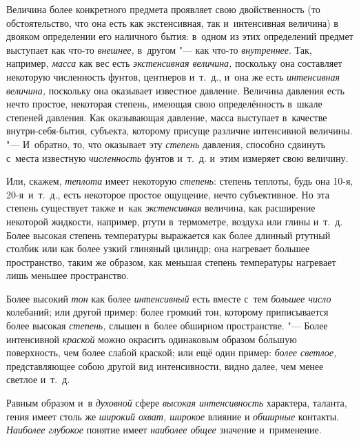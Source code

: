 Величина более конкретного предмета проявляет свою двойственность (то
обстоятельство, что она есть как экстенсивная, так и~интенсивная величина)
в двояком определении его наличного бытия: в~одном из этих определений
предмет выступает как что-то {\em внешнее,} в~другом "--- как что-то
{\em внутреннее}. Так, например, {\em масса} как вес есть {\em экстенсивная
величина,} поскольку она составляет некоторую численность фунтов, центнеров
и~т.~д., и~она же есть {\em интенсивная величина,} поскольку она оказывает
известное давление. Величина давления есть нечто простое, некоторая степень,
имеющая свою определённость в~шкале степеней давления. Как оказывающая
давление, масса выступает в~качестве внутри-себя-бытия, субъекта, которому
присуще различие интенсивной величины. "--- И~обратно, то, что оказывает эту
{\em степень} давления, способно сдвинуть с~места известную {\em численность}
фунтов и~т.~д. и~этим измеряет свою величину.

Или, скажем, {\em теплота} имеет некоторую {\em степень}: степень теплоты, будь
она 10-я, 20-я~и~т.~д., есть некоторое простое ощущение, нечто субъективное. Но
эта степень существует также и~как {\em экстенсивная} величина, как расширение
некоторой жидкости, например, ртути в~термометре, воздуха или глины и~т.~д.
Более высокая степень температуры выражается как более длинный ртутный столбик
или как более узкий глиняный цилиндр; она нагревает большее пространство,
таким же образом, как меньшая степень температуры нагревает лишь меньшее
пространство.

Более высокий {\em тон} как более {\em интенсивный} есть вместе с~тем
{\em большее число} колебаний; или другой пример: более громкий тон,
которому приписывается более высокая {\em степень,} слышен в~более обширном
пространстве. "--- Более интенсивной {\em краской} можно окрасить одинаковым
образом б\'{о}льшую поверхность, чем более слабой краской; или ещё один пример:
{\em более светлое,} представляющее собою другой вид интенсивности, видно
далее, чем менее светлое и~т.~д.

Равным образом и~в {\em духовной} сфере {\em высокая интенсивность} характера,
таланта, гения имеет столь же {\em широкий охват, широкое}
влияние и {\em обширные} контакты.
{\em Наиболее глубокое} понятие имеет {\em наиболее общее}
значение и~применение.


